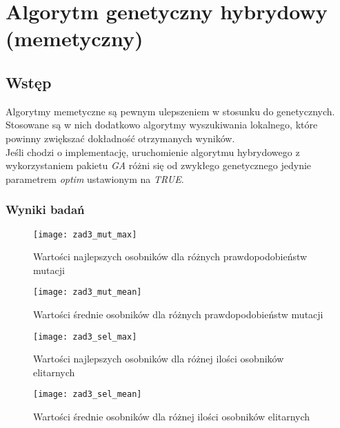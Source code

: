 \section{Algorytm genetyczny hybrydowy (memetyczny)}

\subsection{Wstęp}

Algorytmy memetyczne są pewnym ulepszeniem w stosunku do genetycznych. Stosowane są w nich dodatkowo algorytmy wyszukiwania lokalnego, które powinny zwiększać dokładność otrzymanych wyników.\\
Jeśli chodzi o implementację, uruchomienie algorytmu hybrydowego z wykorzystaniem pakietu \textit{GA} różni się od zwykłego genetycznego jedynie parametrem \textit{optim} ustawionym na \textit{TRUE}.

\subsubsection{Wyniki badań}

\begin{figure}[H]
	\centering
	\hspace*{-0.8in}
	\texttt{[image: zad3\_mut\_max]}
	\caption{Wartości najlepszych osobników dla różnych prawdopodobieństw mutacji}  
	\label{rys:zad3_mut_max} 
\end{figure}

\begin{figure}[H]
	\centering
	\hspace*{-0.8in}
	\texttt{[image: zad3\_mut\_mean]}
	\caption{Wartości średnie osobników dla różnych prawdopodobieństw mutacji}  
	\label{rys:zad3_mut_mean} 
\end{figure}

\begin{figure}[H]
	\centering
	\hspace*{-0.8in}
	\texttt{[image: zad3\_sel\_max]}
	\caption{Wartości najlepszych osobników dla różnej ilości osobników elitarnych}  
	\label{rys:zad3_sel_max} 
\end{figure}

\begin{figure}[H]
	\centering
	\hspace*{-0.8in}
	\texttt{[image: zad3\_sel\_mean]}
	\caption{Wartości średnie osobników dla różnej ilości osobników elitarnych}  
	\label{rys:zad3_sel_mean} 
\end{figure}

